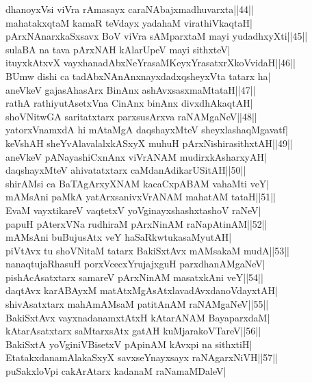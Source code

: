\documentclass{article}
\begin{document}
dhanoyxVsi viVra rAmasayx caraNAbajxmadhuvarxta||44||\\
mahatakxqtaM kamaR teVdayx yadahaM virathiVkaqtaH|\\
pArxNAnarxkaSxsavx BoV viVra sAMparxtaM mayi yudadhxyXti||45||\\
sulaBA na tava pArxNAH kAlarUpeV mayi sithxteV|\\
ituyxkAtxvX vayxhanadAbxNeYrasaMKeyxYrasatxrXkoVvidaH||46||\\
BUmw dishi ca tadAbxNAnAnxnayxdadxqsheyxVta tatarx ha|\\
aneVkeV gajasAhasArx BinAnx ashAvxsasxmaMtataH||47||\\
rathA rathiyutAsetxVna CinAnx binAnx divxdhAkaqtAH|\\
shoVNitwGA saritatxtarx parxsusArxva raNAMgaNeV||48||\\
yatorxVnamxdA hi mAtaMgA daqshayxMteV sheyxlashaqMgavatf|\\
keVshAH sheYvAlavalalxkASxyX muhuH pArxNishirasithxtAH||49||\\
aneVkeV pANayashiCxnAnx viVrANAM mudirxkAsharxyAH|\\
daqshayxMteV ahivatatxtarx caMdanAdikarUSitAH||50||\\
shirAMsi ca BaTAgArxyXNAM kacaCxpABAM vahaMti veY|\\
mAMsAni paMkA yatArxsanivxVrANAM mahatAM tataH||51||\\
EvaM vayxtikareV vaqtetxV yoVginayxshashxtashoV raNeV|\\
papuH pAterxVNa rudhiraM pArxNinAM raNapAtinAM||52||\\
mAMsAni buBujusAtx veY haSaRkwtukasaMyutAH|\\
piVtAvx tu shoVNitaM tatarx BakiSxtAvx mAMsakaM mudA||53||\\
nanaqtujaRhasuH porxVcecxYrujajxguH parxdhanAMgaNeV|\\
pishAcAsatxtarx samareV pArxNinAM masatxkAni veY||54||\\
daqtAvx karABAyxM matAtxMgAsAtxlavadAvxdanoVdayxtAH|\\
shivAsatxtarx mahAmAMsaM patitAnAM raNAMgaNeV||55||\\
BakiSxtAvx vayxnadanamxtAtxH kAtarANAM BayaparxdaM|\\
kAtarAsatxtarx saMtarxsAtx gatAH kuMjarakoVTareV||56||\\
BakiSxtA yoVginiVBisetxV pApinAM kAvxpi na sithxtiH|\\
EtatakxdanamAlakaSxyX savxseYnayxsayx raNAgarxNiVH||57||\\
puSakxloVpi cakArAtarx kadanaM raNamaMDaleV|\\
\end{document}
